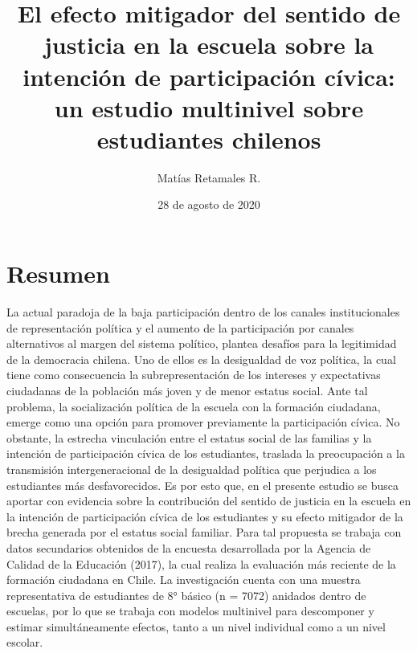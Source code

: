 \documentclass[12pt,twoside]{templates/facsothesis}
\title{El efecto mitigador del sentido de justicia en la escuela sobre la intención de participación cívica: un estudio multinivel sobre estudiantes chilenos}
\author{Matías Retamales R.}
\date{28 de agosto de 2020}
\begin{document}

  \maketitle

\frontmatter %
\pagestyle{empty} %



  \setcounter{tocdepth}{1}
  \setlength{\parskip}{0pt}
  \tableofcontents

\setlength\parskip{1em plus 0.1em minus 0.2em}





\mainmatter %
\pagestyle{fancyplain} %

\hypertarget{resumen}{%
\chapter*{Resumen}\label{resumen}}

La actual paradoja de la baja participación dentro de los canales institucionales de representación política y el aumento de la participación por canales alternativos al margen del sistema político, plantea desafíos para la legitimidad de la democracia chilena. Uno de ellos es la desigualdad de voz política, la cual tiene como consecuencia la subrepresentación de los intereses y expectativas ciudadanas de la población más joven y de menor estatus social. Ante tal problema, la socialización política de la escuela con la formación ciudadana, emerge como una opción para promover previamente la participación cívica. No obstante, la estrecha vinculación entre el estatus social de las familias y la intención de participación cívica de los estudiantes, traslada la preocupación a la transmisión intergeneracional de la desigualdad política que perjudica a los estudiantes más desfavorecidos. Es por esto que, en el presente estudio se busca aportar con evidencia sobre la contribución del sentido de justicia en la escuela en la intención de participación cívica de los estudiantes y su efecto mitigador de la brecha generada por el estatus social familiar. Para tal propuesta se trabaja con datos secundarios obtenidos de la encuesta desarrollada por la Agencia de Calidad de la Educación (2017), la cual realiza la evaluación más reciente de la formación ciudadana en Chile. La investigación cuenta con una muestra representativa de estudiantes de 8° básico (n = 7072) anidados dentro de escuelas, por lo que se trabaja con modelos multinivel para descomponer y estimar simultáneamente efectos, tanto a un nivel individual como a un nivel escolar.
\end{document}

